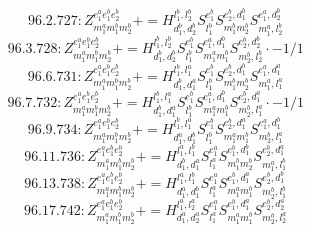 \documentclass[letterpaper,10pt,fleqn,leqno,onecolumn]{article}
\begin{document}
\begin{equation} \;\;\;\;\;\;  96.2.727: Z^{e_{1}^{a}e_{1}^{b}e_{2}^{b}}_{m_{1}^{a}m_{1}^{b}m_{2}^{b}}+=H^{l_{1}^{b},l_{2}^{b}}_{d_{1}^{b},d_{2}^{b}}S^{e_{1}^{b}}_{l_{1}^{b}}S^{e_{2}^{b},d_{1}^{b}}_{m_{1}^{b}m_{2}^{b}}S^{e_{1}^{a},d_{2}^{b}}_{m_{1}^{a},l_{2}^{b}} \end{equation}
\begin{equation} \;\;\;\;\;\;  96.3.728: Z^{e_{1}^{a}e_{1}^{b}e_{2}^{b}}_{m_{1}^{a}m_{1}^{b}m_{2}^{b}}+=H^{l_{1}^{b},l_{2}^{b}}_{d_{1}^{b},d_{2}^{b}}S^{e_{1}^{b}}_{l_{1}^{b}}S^{e_{1}^{a},d_{1}^{b}}_{m_{1}^{a}m_{1}^{b}}S^{e_{2}^{b},d_{2}^{b}}_{m_{2}^{b},l_{2}^{b}}\cdot -1/1 \end{equation}
\begin{equation} \;\;\;\;\;\;  96.6.731: Z^{e_{1}^{a}e_{1}^{b}e_{2}^{b}}_{m_{1}^{a}m_{1}^{b}m_{2}^{b}}+=H^{l_{1}^{b},l_{1}^{a}}_{d_{1}^{b},d_{1}^{a}}S^{e_{1}^{b}}_{l_{1}^{b}}S^{e_{2}^{b},d_{1}^{b}}_{m_{1}^{b}m_{2}^{b}}S^{e_{1}^{a},d_{1}^{a}}_{m_{1}^{a},l_{1}^{a}} \end{equation}
\begin{equation} \;\;\;\;\;\;  96.7.732: Z^{e_{1}^{a}e_{1}^{b}e_{2}^{b}}_{m_{1}^{a}m_{1}^{b}m_{2}^{b}}+=H^{l_{1}^{b},l_{1}^{a}}_{d_{1}^{b},d_{1}^{a}}S^{e_{1}^{b}}_{l_{1}^{b}}S^{e_{1}^{a},d_{1}^{b}}_{m_{1}^{a}m_{1}^{b}}S^{e_{2}^{b},d_{1}^{a}}_{m_{2}^{b},l_{1}^{a}}\cdot -1/1 \end{equation}
\begin{equation} \;\;\;\;\;\;  96.9.734: Z^{e_{1}^{a}e_{1}^{b}e_{2}^{b}}_{m_{1}^{a}m_{1}^{b}m_{2}^{b}}+=H^{l_{1}^{b},l_{1}^{a}}_{d_{1}^{a},d_{1}^{b}}S^{e_{1}^{b}}_{l_{1}^{b}}S^{e_{2}^{b},d_{1}^{a}}_{m_{1}^{a}m_{1}^{b}}S^{e_{1}^{a},d_{1}^{b}}_{m_{2}^{b},l_{1}^{a}} \end{equation}
\begin{equation} \;\;\;\;\;\;  96.11.736: Z^{e_{1}^{a}e_{1}^{b}e_{2}^{b}}_{m_{1}^{a}m_{1}^{b}m_{2}^{b}}+=H^{l_{1}^{a},l_{1}^{b}}_{d_{1}^{b},d_{1}^{a}}S^{e_{1}^{a}}_{l_{1}^{a}}S^{e_{1}^{b},d_{1}^{b}}_{m_{1}^{b}m_{2}^{b}}S^{e_{2}^{b},d_{1}^{a}}_{m_{1}^{a},l_{1}^{b}} \end{equation}
\begin{equation} \;\;\;\;\;\;  96.13.738: Z^{e_{1}^{a}e_{1}^{b}e_{2}^{b}}_{m_{1}^{a}m_{1}^{b}m_{2}^{b}}+=H^{l_{1}^{a},l_{1}^{b}}_{d_{1}^{a},d_{1}^{b}}S^{e_{1}^{a}}_{l_{1}^{a}}S^{e_{1}^{b},d_{1}^{a}}_{m_{1}^{a}m_{1}^{b}}S^{e_{2}^{b},d_{1}^{b}}_{m_{2}^{b},l_{1}^{b}} \end{equation}
\begin{equation} \;\;\;\;\;\;  96.17.742: Z^{e_{1}^{a}e_{1}^{b}e_{2}^{b}}_{m_{1}^{a}m_{1}^{b}m_{2}^{b}}+=H^{l_{1}^{a},l_{2}^{a}}_{d_{1}^{a},d_{2}^{a}}S^{e_{1}^{a}}_{l_{1}^{a}}S^{e_{1}^{b},d_{1}^{a}}_{m_{1}^{a}m_{1}^{b}}S^{e_{2}^{b},d_{2}^{a}}_{m_{2}^{b},l_{2}^{a}} \end{equation}
\end{document}
